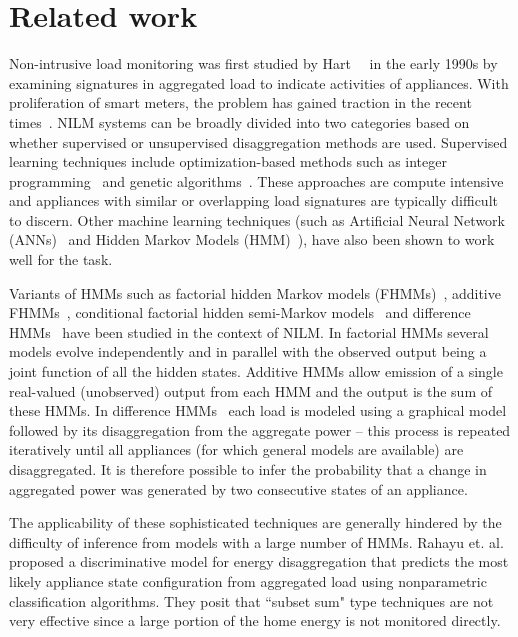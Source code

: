 \documentclass[conference]{IEEEtran}
\begin{document}
\vspace{-2mm}
\section{Related work}
\vspace{-1mm}
\noindent Non-intrusive load monitoring was first studied by Hart~~\cite{hart} in the early 1990s by examining signatures in aggregated load to indicate activities of appliances. With proliferation of smart meters, the problem has gained traction in the recent times~\cite{survey1,survey2,survey3}. NILM systems can be broadly divided into two categories based on whether supervised or unsupervised disaggregation methods are used.
\noindent Supervised learning techniques include optimization-based methods such as integer programming~\cite{Suzuki_08} and genetic algorithms~\cite{Baranski_04}. These approaches are compute intensive and appliances with similar or overlapping load signatures are typically difficult to discern. Other machine learning techniques (such as Artificial Neural Network (ANNs)~\cite{Ruzzelli_10} and Hidden Markov Models (HMM)~\cite{Zia_11}), have also been shown to work well for the task. 

\noindent Variants of HMMs such as factorial hidden Markov models (FHMMs)~\cite{Ghahramani_97a}, additive FHMMs~\cite{Kolter_12}, conditional factorial hidden semi-Markov models~\cite{Kim_11} and difference HMMs~\cite{parson2012_aaai} have been studied in the context of NILM. In factorial HMMs several models evolve independently and in parallel with the observed output being a joint function of all the hidden states. Additive HMMs allow emission of a single real-valued (unobserved) output from each HMM and the output is the sum of these HMMs. In difference HMMs~\cite{parson2012_aaai} each load is modeled using a graphical model followed by its disaggregation from the aggregate power -- this process is repeated iteratively until all appliances (for which general models are available) are disaggregated. It is therefore possible to infer the probability that a change in aggregated power was generated by two consecutive states of an appliance. 

\noindent The applicability of these sophisticated techniques are generally hindered by the difficulty of inference from models with a large number of HMMs. Rahayu et. al.~\cite{Rahayu_12} proposed a discriminative model for energy disaggregation that predicts the most likely appliance state configuration from aggregated load using nonparametric classification algorithms. They posit that ``subset sum" type techniques are not very effective since a large portion of the home energy is not monitored directly. 
\end{document}
